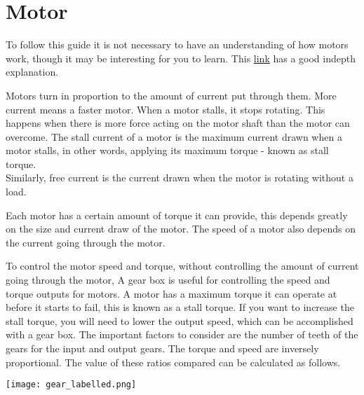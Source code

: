 \documentclass[../TinyBot.tex]{subfiles}
\begin{document}
    
\section{Motor} \label{sec:motor}

To follow this guide it is not necessary to have an understanding of how motors work,
though it may be interesting for you to learn. This \href{https://www.explainthatstuff.com/electricmotors.html}{link}
has a good indepth explanation. 

\bigskip

Motors turn in proportion to the amount of current put through them. More current means a faster motor. 
When a motor stalls, it stops rotating. This happens when there is more force acting on the motor shaft
than the motor can overcome. The stall current of a motor is the maximum current drawn when a motor stalls,
in other words, applying its maximum torque - known as stall torque. \\

Similarly, free current is the current drawn when the motor is rotating without a load.

\bigskip


Each motor has a certain amount of torque it can provide, this depends greatly on the size and current
draw of the motor. The speed of a motor also depends on the current going through the motor. 


\begin{minipage}[t]{0.6\textwidth}\vspace{0pt}

    To control the motor speed and torque, without controlling the amount of current going through
    the motor, A gear box is useful for controlling the speed and torque outputs for motors.
    A motor has a maximum torque it can operate at before it starts to fail,
    this is known as a stall torque. If you want to increase the stall torque,
    you will need to lower the output speed, which can be accomplished with a gear box.
    The important factors to consider are the number of teeth of the gears for the input and
    output gears. The torque and speed are inversely proportional. The value of these ratios
    compared can be calculated as follows.\\
    
\end{minipage}
\begin{minipage}[t]{0.4\textwidth}\vspace{0pt}
    \begin{center}
        \texttt{[image: gear\_labelled.png]}
        \label{fig:gear-driver-driven}
    \end{center}
\end{minipage}
\end{document}
